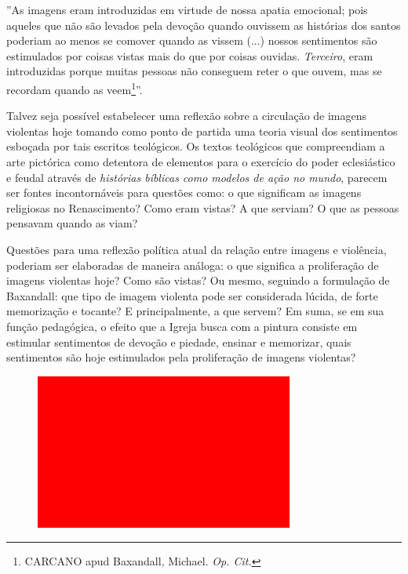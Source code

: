 ''As imagens eram introduzidas em virtude de nossa apatia
emocional; pois aqueles que não são levados pela devoção quando ouvissem
as histórias dos santos poderiam ao menos se comover quando as vissem
(...) nossos sentimentos são estimulados por coisas vistas mais do que
por coisas ouvidas. \emph{Terceiro}, eram introduzidas porque muitas
pessoas não conseguem reter o que ouvem, mas se recordam quando as
veem\footnote{CARCANO apud Baxandall, Michael. \emph{Op. Cit.}}''.

Talvez seja possível estabelecer uma reflexão sobre a circulação de
imagens violentas hoje tomando como ponto de partida uma teoria visual
dos sentimentos esboçada por tais escritos teológicos. Os textos
teológicos que compreendiam a arte pictórica como detentora de elementos
para o exercício do poder eclesiástico e feudal através de
\emph{histórias bíblicas como modelos de ação no mundo}, parecem ser
fontes incontornáveis para questões como: o que significam as imagens
religiosas no Renascimento? Como eram vistas? A que serviam? O que as
pessoas pensavam quando as viam?

Questões para uma reflexão política atual da relação entre imagens e
violência, poderiam ser elaboradas de maneira análoga: o que significa a
proliferação de imagens violentas hoje? Como são vistas? Ou mesmo,
seguindo a formulação de Baxandall: que tipo de imagem violenta pode ser
considerada lúcida, de forte memorização e tocante? E principalmente, a
que servem? Em suma, se em sua função pedagógica, o efeito que a Igreja
busca com a pintura consiste em estimular sentimentos de devoção e
piedade, ensinar e memorizar, quais sentimentos são hoje estimulados
pela proliferação de imagens violentas?


\begin{figure}[!ht]
\centering
 \includegraphics[width=85mm]{./imgs/im1.jpg}
\caption{\footnotesize{}}
\end{figure}

